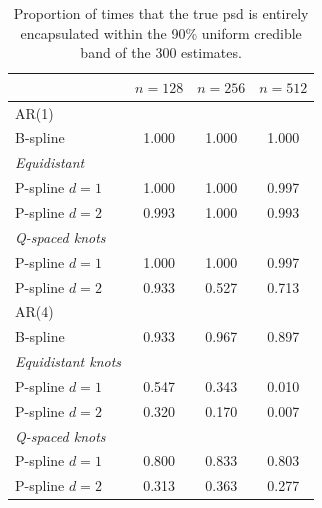 \documentclass[twocolumn,final]{svjour3}
\begin{document}
\begin{table}
	\centering
		\begin{tabular}{lccc}
			\toprule
			& $n=128$ & $n=256$ & $n=512$ \\ \hline
			AR(1)     &  &  &  \\ 
			B-spline &  1.000 & 1.000 & 1.000 \\
			\textit{Equidistant}& & &   \\
			\hspace{0.5em}P-spline $d=1$&  1.000 & 1.000 & 0.997\\
			\hspace{0.5em}P-spline $d=2$& 0.993 & 1.000 & 0.993  \\
			\textit{Q-spaced knots}& & &   \\
			\hspace{0.5em}P-spline $d=1$ & 1.000 & 1.000 & 0.997 \\
			\hspace{0.5em}P-spline $d=2$ & 0.933 & 0.527 & 0.713 \\ \hline		       
			AR(4)     &  &  &  \\ 
			B-spline &  0.933 & 0.967 & 0.897  \\
			\textit{Equidistant knots}& & &   \\
			\hspace{0.5em}P-spline $d=1$ &  0.547 & 0.343 & 0.010 \\
			\hspace{0.5em}P-spline $d=2$ & 0.320 & 0.170 & 0.007\\
			\textit{Q-spaced knots}& & &   \\	
			\hspace{0.5em}P-spline $d=1$ & 0.800 & 0.833 & 0.803 \\
			\hspace{0.5em}P-spline $d=2$ & 0.313 & 0.363 & 0.277 \\
			\bottomrule
		\end{tabular}
	\caption{Proportion of times that the true psd is entirely encapsulated within the 90\% uniform credible band of the 300 estimates.}
	\label{table:sim_covPbb}
\end{table}
\end{document}

